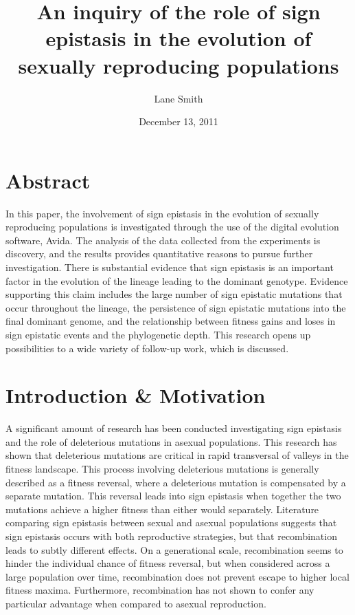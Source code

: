 \documentclass[a4paper, 10pt]{article}
\begin{document}
\title{An inquiry of the role of sign epistasis in the evolution of sexually reproducing populations}
\author{Lane Smith}
\date{December 13, 2011}
\maketitle

\section{Abstract}

In this paper, the involvement of sign epistasis in the evolution of sexually reproducing populations is investigated through the use of the digital evolution software, Avida. The analysis of the data collected from the experiments is discovery, and the results provides quantitative reasons to pursue further investigation. There is substantial evidence that sign epistasis is an important factor in the evolution of the lineage leading to the dominant genotype. Evidence supporting this claim includes the large number of sign epistatic mutations that occur throughout the lineage, the persistence of sign epistatic mutations into the final dominant genome, and the relationship between fitness gains and loses in sign epistatic events and the phylogenetic depth. This research opens up possibilities to a wide variety of follow-up work, which is discussed. 

\section{Introduction \& Motivation}

A significant amount of research has been conducted investigating sign epistasis and the role of deleterious mutations in asexual populations\cite{covert}\cite{cow}. This research has shown that deleterious mutations are critical in rapid transversal of valleys in the fitness landscape. This process involving deleterious mutations is generally described as a fitness reversal, where a deleterious mutation is compensated by a separate mutation. This reversal leads into sign epistasis when together the two mutations achieve a higher fitness than either would separately. Literature comparing sign epistasis between sexual and asexual populations suggests that sign epistasis occurs with both reproductive strategies, but that recombination leads to subtly different effects\cite{visser}. On a generational scale, recombination seems to hinder the individual chance of fitness reversal, but when considered across a large population over time, recombination does not prevent escape to higher local fitness maxima\cite{weinreich}. Furthermore, recombination has not shown to confer any particular advantage when compared to asexual reproduction.
\end{document}
